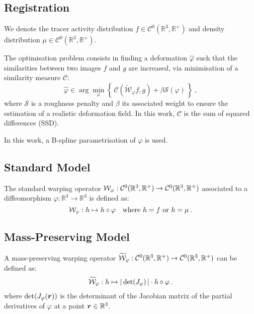 \documentclass[portrait,color=UCLrichred,margin=3cm]{uclposter}
\begin{document}
\begin{multicols}{4}

\columnbreak

\section*{Registration}

We denote the tracer activity distribution $f\in\mathcal{C}^{0}(\mathbb{R}^3,\mathbb{R}^+)$ and density distribution  $\mu\in\mathcal{C}^{0}(\mathbb{R}^3,\mathbb{R}^+)$.

The optimisation problem consists in finding a deformation $\hat{\varphi}$ such that the similarities between two images $f$ and $g$ are increased, \eg via minimisation of a similarity measure $\mathcal{C}$:
\begin{equation*}
    \hat{\varphi} \in \arg \min_{\varphi}\left\{\,\mathcal{C}(\widetilde{\mathcal{W}}_\varphi f,g) + \beta \mathcal{S}(\varphi)\,\right\}\:,
\end{equation*}
where $\mathcal{S}$ is a roughness penalty and $\beta$ its associated weight to ensure the estimation of a realistic deformation field.
In this work, $\mathcal{C}$ is the sum of squared differences (SSD).

In this work, a B-spline parametrisation of $\varphi$ is used. %

\subsection*{Standard Model}

The standard warping operator $\mathcal{W}_\varphi : \mathcal{C}^{0}(\mathbb{R}^3,\mathbb{R}^+) \rightarrow \mathcal{C}^{0}(\mathbb{R}^3,\mathbb{R}^+)$ associated to a diffeomorphism $\varphi : \mathbb{R}^3 \rightarrow \mathbb{R}^3$ is defined as:
\begin{equation*}
    \mathcal{W}_\varphi : h \mapsto h \circ \varphi \quad \text{where } h = f\text{ or }h=\mu\:.
\end{equation*}

\subsection*{Mass-Preserving Model}

A mass-preserving warping operator $\widetilde{\mathcal{W}}_\varphi : \mathcal{C}^{0}(\mathbb{R}^3,\mathbb{R}^+) \rightarrow \mathcal{C}^{0}(\mathbb{R}^3,\mathbb{R}^+)$ can be defined as:
\begin{equation*}
    \widetilde{\mathcal{W}}_\varphi : h \mapsto \left|\, \det(J_\varphi)\,\right| \cdot h \circ \varphi \:.
\end{equation*}
where $\det(J_\varphi(\bm{r}))$ is the determinant of the Jacobian matrix of the partial derivatives of $\varphi$ at a point $\bm{r}\in\mathbb{R}^3$.


\end{multicols}
\end{document}
